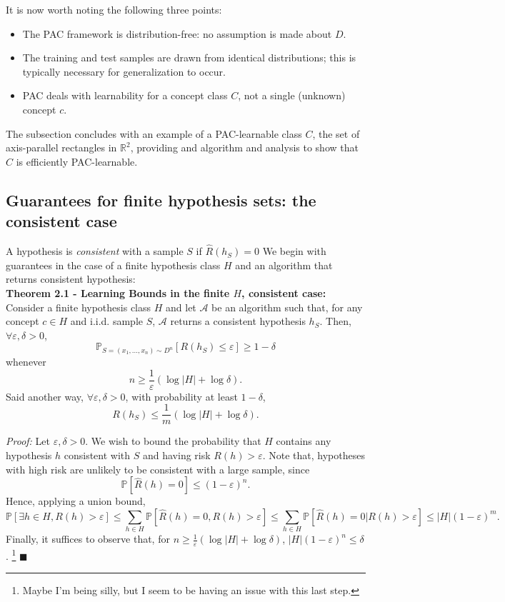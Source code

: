 \documentclass[10pt]{article}
\renewcommand{\qed}{\quad \ensuremath{\blacksquare}}    %
\newcommand{\R}{\mathbb{R}}                         %
\newcommand{\e}{\varepsilon}                        %
\newcommand{\A}{\mathcal{A}}                        %
\newcommand{\pr}{\mathbb{P}}                        %
\renewcommand{\hat}{\widehat}
\begin{document}
It is now worth noting the following three points:
\begin{itemize}
\item The PAC framework is distribution-free: no assumption is made about $D$.
\item The training and test samples are drawn from identical distributions;
this is typically necessary for generalization to occur.
\item PAC deals with learnability for a concept class $C$, not a single
(unknown) concept $c$.
\end{itemize}
The subsection concludes with an example of a PAC-learnable class $C$, the set
of axis-parallel rectangles in $\R^2$, providing and algorithm and analysis to
show that $C$ is efficiently PAC-learnable.

\subsection{Guarantees for finite hypothesis sets: the consistent case}
A hypothesis is \emph{consistent} with a sample $S$ if $\hat R(h_S) = 0$
We begin with guarantees in the case of a finite hypothesis class $H$ and an
algorithm that returns consistent hypothesis:\\

{\bf Theorem 2.1 - Learning Bounds in the finite $H$, consistent case:}
Consider a finite hypothesis class $H$ and let $\A$ be an algorithm such that,
for any concept $c \in H$ and i.i.d. sample $S$, $\A$ returns a consistent
hypothesis $h_S$. Then, $\forall \e, \delta > 0$,
\[\pr_{S = (x_1,\dots,x_n) \sim D^n}\left[ R(h_S) \leq \e \right]
    \geq 1 - \delta\]
whenever
\[n \geq \frac1\e \left( \log|H| + \log \delta \right).\]
Said another way, $\forall \e, \delta > 0$, with probability at least
$1 - \delta$,
\[R(h_S) \leq \frac1m \left( \log|H| + \log \delta \right).\]

\emph{Proof:} Let $\e,\delta > 0$. We wish to bound the probability that $H$
contains any hypothesis $h$ consistent with $S$ and having risk $R(h) > \e$.
Note that, hypotheses with high risk are unlikely to be consistent with a large
sample, since
\[\pr\left[ \hat R(h) = 0 \right] \leq (1 - \e)^n.\]
Hence, applying a union bound,
\[\pr\left[ \exists h \in H, R(h) > \e \right]
    \leq \sum_{h \in H} \pr\left[ \hat R(h) = 0, R(h) > \e \right]
    \leq \sum_{h \in H} \pr\left[ \hat R(h) = 0 | R(h) > \e \right]
    \leq |H|(1 - \e)^m.
\]
Finally, it suffices to observe that, for
$n \geq \frac1\e \left( \log|H| + \log \delta \right)$,
$|H|(1 - \e)^n \leq \delta$.
\footnote{Maybe I'm being silly, but I seem to be having an issue with this
last step.} \qed \\
\end{document}
